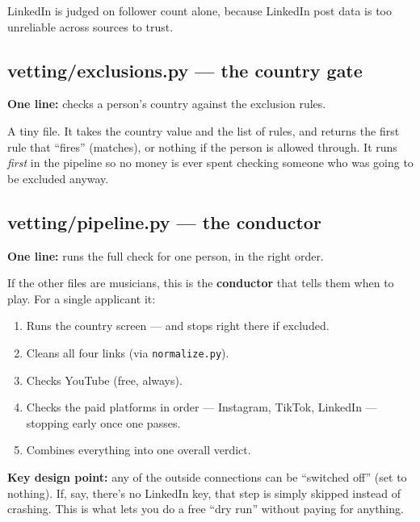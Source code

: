 \documentclass[11pt]{article}
\newcommand{\term}[1]{\textbf{\color{brandpurple}#1}}
\newcommand{\file}[1]{\texttt{\color{inkdark}#1}}
\begin{document}
LinkedIn is judged on follower count alone, because LinkedIn post data is too
unreliable across sources to trust.

\subsection{vetting/exclusions.py — the country gate}
\begin{plainbox}
\textbf{One line:} checks a person's country against the exclusion rules.
\end{plainbox}

A tiny file. It takes the country value and the list of rules, and returns the
first rule that ``fires'' (matches), or nothing if the person is allowed
through. It runs \emph{first} in the pipeline so no money is ever spent checking
someone who was going to be excluded anyway.

\subsection{vetting/pipeline.py — the conductor}
\begin{plainbox}
\textbf{One line:} runs the full check for one person, in the right order.
\end{plainbox}

If the other files are musicians, this is the \term{conductor} that tells them
when to play. For a single applicant it:
\begin{enumerate}
  \item Runs the country screen — and stops right there if excluded.
  \item Cleans all four links (via \file{normalize.py}).
  \item Checks YouTube (free, always).
  \item Checks the paid platforms in order — Instagram, TikTok, LinkedIn —
  stopping early once one passes.
  \item Combines everything into one overall verdict.
\end{enumerate}

\begin{analogybox}
\textbf{Key design point:} any of the outside connections can be ``switched
off'' (set to nothing). If, say, there's no LinkedIn key, that step is simply
skipped instead of crashing. This is what lets you do a free ``dry run''
without paying for anything.
\end{analogybox}
\end{document}
